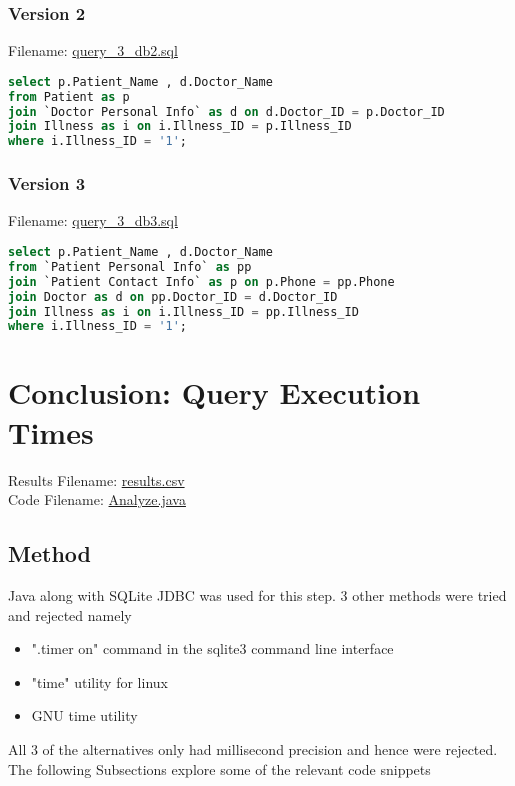 \documentclass[12pt,arial]{article}
\begin{document}
\subsubsection{Version 2}
Filename: \url{query_3_db2.sql}
\begin{lstlisting}[language=SQL]
select p.Patient_Name , d.Doctor_Name
from Patient as p
join `Doctor Personal Info` as d on d.Doctor_ID = p.Doctor_ID
join Illness as i on i.Illness_ID = p.Illness_ID
where i.Illness_ID = '1';
\end{lstlisting}
\subsubsection{Version 3}
Filename: \url{query_3_db3.sql}
\begin{lstlisting}[language=SQL]
select p.Patient_Name , d.Doctor_Name
from `Patient Personal Info` as pp
join `Patient Contact Info` as p on p.Phone = pp.Phone
join Doctor as d on pp.Doctor_ID = d.Doctor_ID
join Illness as i on i.Illness_ID = pp.Illness_ID
where i.Illness_ID = '1';
\end{lstlisting}
\section{Conclusion: Query Execution Times}
Results Filename: \url{results.csv}
\\Code Filename: \url{Analyze.java}
\subsection{Method}
Java along with SQLite JDBC was used for this step. 3 other methods were tried and rejected namely
\begin{itemize}
	\item  ".timer on" command in the sqlite3 command line interface
	\item "time" utility for linux
	\item GNU time utility
 \end{itemize}
 All 3 of the alternatives only had millisecond precision and hence were rejected.\\
 
The following Subsections explore some of the relevant code snippets
\end{document}
